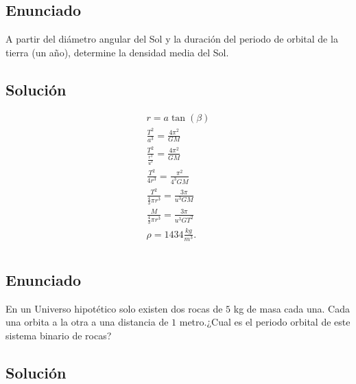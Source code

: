 \documentclass{report}
\begin{document}
\chapter{}

\section{Enunciado}

A partir del diámetro angular del Sol y la duración del periodo de orbital de la tierra (un año), determine la densidad media del Sol.

\section{Solución}

\begin{align*}
  r = a\tan\left( \beta \right) \\
  \frac{T^2}{a^{3}} = \frac{4\pi^2}{GM}\\
  \frac{T^2}{\frac{r^{3}}{u^{3}}} = \frac{4\pi^2}{GM}\\
  \frac{T^2}{4r^{3}}= \frac{\pi^2}{4^{3}GM}\\
  \frac{T^2}{\frac{4}{3}\pi r^{3}} = \frac{3\pi}{u^{3}GM}\\
  \frac{M}{\frac{4}{3}\pi r^{3}}=\frac{3\pi}{u^{3}G T^2}\\
  \rho = 1434 \frac{kg}{m^3}
.\end{align*}


\chapter{}

\section{Enunciado}

En un Universo hipotético solo existen dos rocas de $5$ kg de masa cada una. Cada una orbita a la otra a una distancia de $1$ metro.¿Cual es el periodo orbital de este sistema binario de rocas?

\section{Solución}
\end{document}
